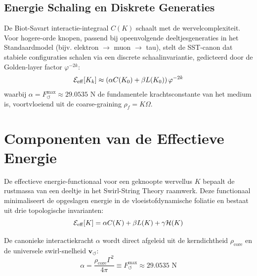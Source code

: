 \documentclass[12pt,a4paper]{article}
\begin{document}
                \subsection*{Energie Schaling en Diskrete Generaties}
                    De Biot-Savart interactie-integraal $C(K)$ schaalt met de wervelcomplexiteit. Voor hogere-orde knopen, passend bij opeenvolgende deeltjesgeneraties in het Standaardmodel (bijv. elektron $\to$ muon $\to$ tau), stelt de SST-canon dat stabiele configuraties schalen via een discrete schaalinvariantie, gedicteerd door de Golden-layer factor $\varphi^{-2k}$:
                    \begin{equation}
                        \mathcal{E}_{\rm eff}[K_k] \approx \left( \alpha C(K_0) + \beta L(K_0) \right) \varphi^{-2k}
                    \end{equation}
                    waarbij $\alpha = F_{\!\boldsymbol{\circlearrowleft}}^{\max} \approx 29.0535 \text{ N}$ de fundamentele krachtsconstante van het medium is, voortvloeiend uit de coarse-graining $\rho_{\!f} = K \Omega$.
            

  

                
                \section{Componenten van de Effectieve Energie}
                    
                    De effectieve energie-functionaal voor een geknoopte wervellus $K$ bepaalt de rustmassa van een deeltje in het Swirl-String Theory raamwerk. Deze functionaal minimaliseert de opgeslagen energie in de vloeistofdynamische foliatie en bestaat uit drie topologische invarianten:
                    \begin{equation}
                        \mathcal{E}_{\rm eff}[K] = \alpha C(K) + \beta L(K) + \gamma \mathcal{H}(K)
                    \end{equation}
                    
                    De canonieke interactiekracht $\alpha$ wordt direct afgeleid uit de kerndichtheid $\rho_{\text{core}}$ en de universele swirl-snelheid $\mathbf{v}_{\!\boldsymbol{\circlearrowleft}}$:
                    \begin{equation}
                        \alpha = \frac{\rho_{\text{core}} \Gamma^2}{4\pi} \equiv F_{\!\boldsymbol{\circlearrowleft}}^{\max} \approx 29.0535 \text{ N}
                    \end{equation}
                    
\end{document}
